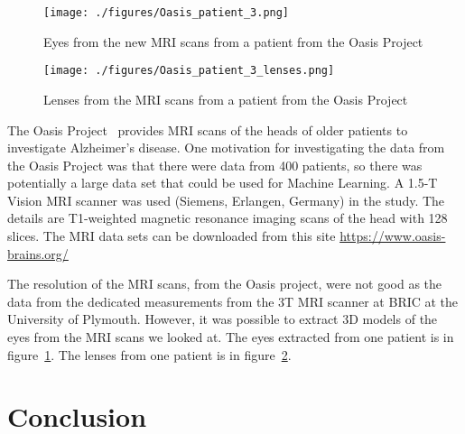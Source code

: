 \documentclass[12pt]{article}
\begin{document}
\begin{figure}
\centering
\texttt{[image: ./figures/Oasis\_patient\_3.png]} 
\caption{Eyes from the new MRI scans from a patient from the Oasis Project}
\label{fg:eyeOasis}
\end{figure}



\begin{figure}
\centering
\texttt{[image: ./figures/Oasis\_patient\_3\_lenses.png]} 
\caption{Lenses from the MRI scans from a patient from the Oasis Project}
\label{fg:lenOasis}
\end{figure}




The Oasis Project~\cite{van2021mri} provides MRI scans of the heads of
older patients to investigate Alzheimer's disease.  One motivation for
investigating the data from the Oasis Project was that there were data
from 400 patients, so there was potentially a large data set that
could be used for Machine Learning.  A 1.5-T Vision MRI scanner was
used (Siemens, Erlangen, Germany) in the study.  The details are
T1-weighted magnetic resonance imaging scans of the head with 128
slices.  The MRI data sets can be downloaded from this site
\url{https://www.oasis-brains.org/}


The resolution of the MRI scans, from the Oasis project, were not good
as the data from the dedicated measurements from the 3T MRI scanner at
BRIC at the University of Plymouth. However, it was possible to
extract 3D models of the eyes from the MRI scans we looked at.
The eyes extracted from one patient is in figure~\ref{fg:eyeOasis}.
The lenses from one patient is in figure~\ref{fg:lenOasis}.

\section{Conclusion}



\end{document}
